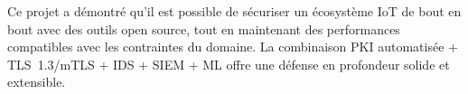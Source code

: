 \vspace{1cm}

Ce projet a démontré qu'il est possible de sécuriser un écosystème IoT de bout en bout avec des outils open source, tout en maintenant des performances compatibles avec les contraintes du domaine. La combinaison PKI automatisée + TLS~1.3/mTLS + IDS + SIEM + ML offre une défense en profondeur solide et extensible.
